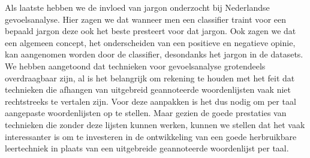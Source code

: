 Als laatste hebben we de invloed van jargon onderzocht bij Nederlandse gevoelsanalyse. Hier zagen we dat wanneer men een classifier traint voor een bepaald jargon deze ook het beste presteert voor dat jargon. Ook zagen we dat een algemeen concept, het onderscheiden van een positieve en negatieve opinie, kan aangenomen worden door de classifier, desondanks het jargon in de datasets.\\

We hebben aangetoond dat technieken voor gevoelsanalyse grotendeels overdraagbaar zijn, al is het belangrijk om rekening te houden met het feit dat technieken die afhangen van uitgebreid geannoteerde woordenlijsten vaak niet rechtstreeks te vertalen zijn. Voor deze aanpakken is het dus nodig om per taal aangepaste woordenlijsten op te stellen. Maar gezien de goede prestaties van technieken die zonder deze lijsten kunnen werken, kunnen we stellen dat het vaak interessanter is om te investeren in de ontwikkeling van een goede herbruikbare leertechniek in plaats van een uitgebreide geannoteerde woordenlijst per taal.